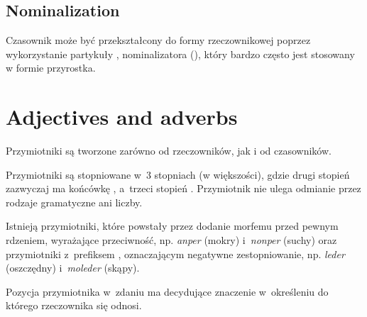 \subsection{Nominalization}

Czasownik może być przekształcony do formy rzeczownikowej poprzez wykorzystanie
partykuły , nominalizatora (\Nmlz{}), który bardzo często jest stosowany w
formie przyrostka.




\section{Adjectives and adverbs}

Przymiotniki są tworzone zarówno od rzeczowników, jak i od czasowników.

Przymiotniki są stopniowane w~3 stopniach (w większości), gdzie drugi stopień
zazwyczaj ma końcówkę , a~trzeci stopień . Przymiotnik nie
ulega odmianie przez rodzaje gramatyczne ani liczby.

Istnieją przymiotniki, które powstały przez dodanie morfemu  przed
pewnym rdzeniem, wyrażające przeciwność, np. \emph{anper}  (mokry)
i~\emph{nonper}  (suchy) oraz przymiotniki z~prefiksem ,
oznaczającym negatywne zestopniowanie, np. \emph{leder}  (oszczędny)
i~\emph{moleder}  (skąpy).

Pozycja przymiotnika w~zdaniu ma decydujące znaczenie w~określeniu do którego
rzeczownika się odnosi.




